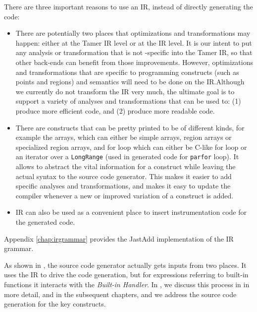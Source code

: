 There are three important reasons to use an IR, instead of directly generating the
\xten code: \begin{itemize} 

\item There are potentially two places that
optimizations and transformations may happen:  either at the Tamer IR level or
at the \mixten IR level.  It is our intent to put any analysis or transformation
that is not \xten-specific into the Tamer IR, so that other back-ends can
benefit from those improvements.   However, optimizations and  transformations
that are specific to \xten programming constructs (such as points and regions)
and semantics will need to be done on the \mixten IR.Although we currently do
not transform the \mixten IR very much, the ultimate goal is to support a
variety of analyses and transformations that can be used to: (1) produce more
efficient \xten code, and (2) produce more readable \xten code.  

\item There are \xten constructs that can be pretty
printed to be of different kinds, for example the \xten arrays, which can either
be simple arrays, region arrays or specialized region arrays, and \xten for loop
which can either be C-like for loop or an iterator over a \texttt{LongRange}
(used in generated code for \texttt{parfor} loop). It allows to abstract the
vital information for a construct while leaving the actual syntax to the source
code generator. This makes it easier to add \xten specific analyses and
transformations, and makes it easy to update the compiler whenever a new or
improved variation of a construct is added. 

\item \mixten IR can also be used as a convenient place to insert
instrumentation code for the generated \xten code.

\end{itemize}   

Appendix \ref{chap:irgrammar} provides the JastAdd implementation of the \mixten IR
grammar.

As shown in , the \xten source code generator actually
gets inputs from two places.   It uses the \mixten IR to drive the code
generation,  but for expressions referring to built-in \matlab functions
it interacts with the \textit{Built-in Handler}.  In 
, we discuss this process in in more detail, and in
the subsequent chapters,   and
 we address the source code
generation for the key \xten constructs.



